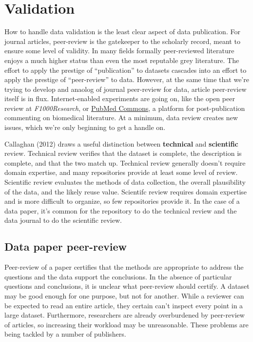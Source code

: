 \documentclass[10pt,twocolumn]{article}
\begin{document}
\section*{Validation}\label{validation}

How to handle data validation is the least clear aspect of data publication.
For journal articles, peer-review is the gatekeeper to the scholarly record, meant to ensure some level of validity.
In many fields formally peer-reviewed literature enjoys a much higher status than even the most reputable grey literature.
The effort to apply the prestige of ``publication'' to datasets cascades into an effort to apply the prestige of ``peer-review'' to data.
However, at the same time that we're trying to develop and anaolog of journal peer-review for data, article peer-review itself is in flux.
Internet-enabled experiments are going on, like the open peer review at \emph{F1000Research}, or \href{http://www.ncbi.nlm.nih.gov/pubmedcommons/}{PubMed Commons}, a platform for post-publication commenting on biomedical literature.
At a minimum, data review creates new issues, which we're only beginning to get a handle on.

Callaghan (2012)\cite{sarah_callaghan_making_2012} draws a useful distinction between \textbf{technical} and \textbf{scientific} review.
Technical review verifies that the dataset is complete, the description is complete, and that the two match up.
Technical review generally doesn't require domain expertise, and many repositories provide at least some level of review.
Scientific review evaluates the methods of data collection, the overall plausibility of the data, and the likely reuse value.
Scientifc review requires domain expertise and is more difficult to organize, so few repositories provide it.
In the case of a data paper, it's common for the repository to do the technical review and the data journal to do the scientific review.

\subsection*{Data paper peer-review}

Peer-review of a paper certifies that the methods are appropriate to address the questions and the data support the conclusions.
In the absence of particular questions and conclusions, it is unclear what peer-review should certify.
A dataset may be good enough for one purpose, but not for another.
While a reviewer can be expected to read an entire article, they certain can't inspect every point in a large dataset.
Furthermore, researchers are already overburdened by peer-review of articles, so increasing their workload may be unreasonable.
These problems are being tackled by a number of publishers.
\end{document}
